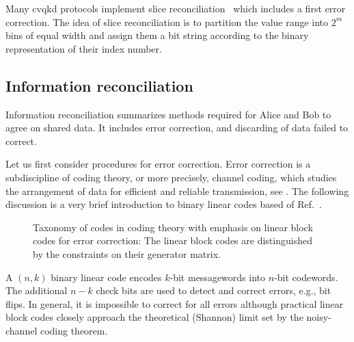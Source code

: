 Many \gls{cvqkd} protocols implement slice reconciliation~\cite{Grosshans2002} which includes a first error correction.
The idea of slice reconciliation is to partition the value range into $2^m$ bins of equal width and assign them a bit string according to the binary representation of their index number.

\FloatBarrier
\subsection{Information reconciliation}

Information reconciliation summarizes methods required for Alice and Bob to agree on shared data.
It includes error correction, and discarding of data failed to correct.

Let us first consider procedures for error correction.
Error correction is a subdiscipline of coding theory, or more precisely, channel coding, which studies the arrangement of data for efficient and reliable transmission, see .
The following discussion is a very brief introduction to binary linear codes based of Ref.~\cite{MacKay2003,Mildenberger2013}.
\begin{figure}[htb]
	\centering
	
	\caption{Taxonomy of codes in coding theory with emphasis on linear block codes for error correction: The linear block codes are distinguished by the constraints on their generator matrix.}\label{fig:error_correction_codes}
\end{figure}
A $(n,k)$ binary linear code encodes $k$-bit messagewords into $n$-bit codewords.
The additional $n-k$ check bits are used to detect and correct errors, e.g., bit flips.
In general, it is impossible to correct for all errors although practical linear block codes closely approach the theoretical (Shannon) limit set by the noisy-channel coding theorem.

